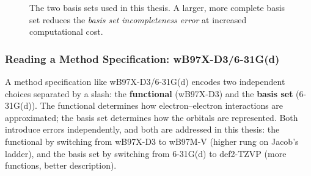 \begin{figure}[h]
\centering
{}
\caption{The two basis sets used in this thesis. A larger, more complete basis
set reduces the \emph{basis set incompleteness error} at increased computational
cost.}
\label{fig:basis-sets}
\end{figure}


\subsubsection{Reading a Method Specification: wB97X-D3/6-31G(d)}

A method specification like \mbox{wB97X-D3/6-31G(d)} encodes two independent
choices separated by a slash: the \textbf{functional} (wB97X-D3) and the
\textbf{basis set} (6-31G(d)). The functional determines how electron--electron
interactions are approximated; the basis set determines how the orbitals are
represented. Both introduce errors independently, and both are addressed in this
thesis: the functional by switching from wB97X-D3 to wB97M-V (higher rung on
Jacob's ladder), and the basis set by switching from 6-31G(d) to def2-TZVP
(more functions, better description).

